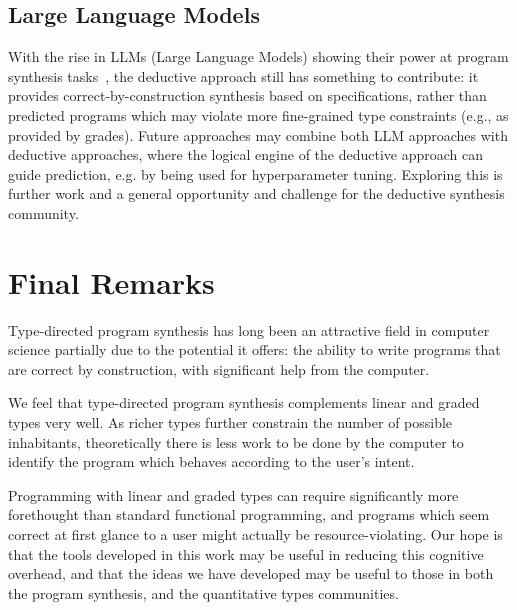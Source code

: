 \subsection{Large Language Models}
With the rise in LLMs (Large Language Models) showing their power at program
synthesis tasks~\citep{DBLP:journals/corr/abs-2108-07732,jain2021jigsaw}, the
deductive approach still has something to contribute: it provides
correct-by-construction synthesis based on specifications, rather than predicted
programs which may violate more fine-grained type constraints (e.g., as provided
by grades). Future approaches may combine both LLM approaches with deductive
approaches, where the logical engine of the deductive approach can guide
prediction, e.g. by being used for hyperparameter tuning. Exploring this is
further work and a general opportunity and challenge for the deductive synthesis
community.


\section{Final Remarks}
Type-directed program synthesis has long been an attractive field in
computer science partially due to the potential it offers: the ability to write
programs that are correct by construction, with significant help from the
computer. 

We feel that type-directed program synthesis complements linear and graded types
very well. As richer types further constrain the number of possible inhabitants,
theoretically there is less work to be done by the computer to identify the
program which behaves according to the user's intent.

Programming with linear and graded types can require significantly more
forethought than standard functional programming, and programs which seem
correct at first glance to a user might actually be resource-violating. Our hope
is that the tools developed in this work may be useful in reducing this
cognitive overhead, and that the ideas we have developed may be useful to those
in both the program synthesis, and the quantitative types communities.